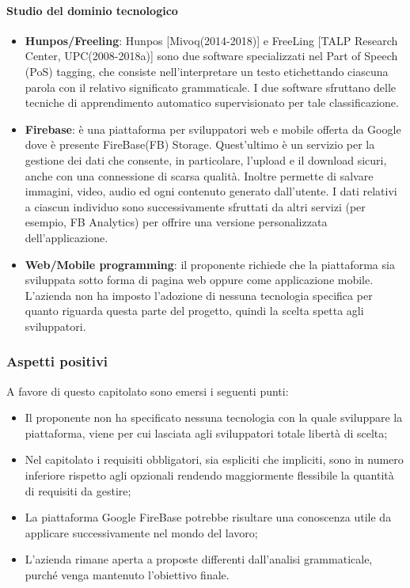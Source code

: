 \paragraph{Studio del dominio tecnologico}
\begin{itemize}
	\item \textbf{Hunpos/Freeling}: Hunpos [Mivoq(2014-2018)] e FreeLing [TALP
	Research Center, UPC(2008-2018a)] sono due software specializzati nel Part
	of Speech (PoS) tagging, che consiste nell'interpretare un testo
	etichettando ciascuna parola con il relativo significato grammaticale. I
	due software sfruttano delle tecniche di apprendimento automatico
	supervisionato per tale classificazione.  
	
	\item \textbf{Firebase}: è una piattaforma per sviluppatori web e mobile
	 offerta da Google dove è presente FireBase(FB) Storage. Quest'ultimo è un
	 servizio per la gestione dei dati che consente, in particolare, l'upload e
	 il download sicuri, anche con una connessione di scarsa qualità. Inoltre 
	 permette di salvare immagini, video, audio ed ogni contenuto generato
	 dall'utente. I dati relativi a ciascun individuo sono successivamente
	 sfruttati da altri servizi (per esempio, FB Analytics) per offrire una versione
	 personalizzata dell'applicazione.
	 
	\item \textbf{Web/Mobile programming}: il proponente richiede che la
	piattaforma sia sviluppata sotto forma di pagina web oppure come
	applicazione mobile. L'azienda non ha imposto l'adozione di nessuna
	tecnologia specifica per quanto riguarda questa parte del progetto, quindi
	la scelta spetta agli sviluppatori.		
\end{itemize}
\subsubsection{Aspetti positivi}
A favore di questo capitolato sono emersi i seguenti punti:
\begin{itemize}
	\item Il proponente non ha specificato nessuna tecnologia con la quale
	 sviluppare la piattaforma, viene per cui lasciata agli sviluppatori totale
	 libertà di scelta;
	\item Nel capitolato i requisiti obbligatori, sia espliciti che impliciti,
	 sono in numero inferiore rispetto agli opzionali rendendo maggiormente
	 flessibile la quantità di requisiti da gestire;
	\item La piattaforma Google FireBase potrebbe risultare una conoscenza
	 utile da applicare successivamente nel mondo del lavoro;
	\item L'azienda rimane aperta a proposte differenti dall'analisi
	 grammaticale, purché venga mantenuto l'obiettivo finale.
	
\end{itemize}
